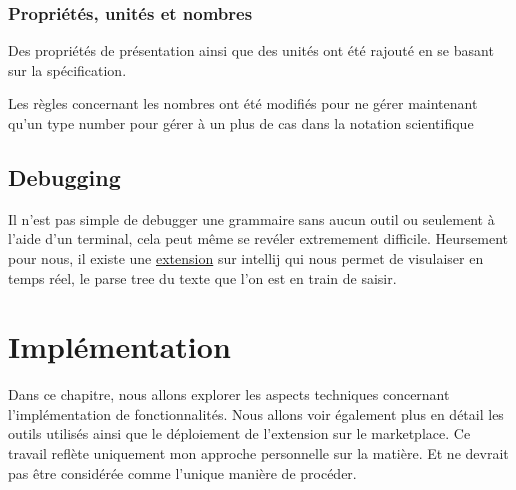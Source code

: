 \documentclass[
    iict, %
    il, %
]{heig-tb}
\begin{document}
\subsection{Propriétés, unités et nombres}

Des propriétés de présentation %
ainsi que des unités ont été rajouté en se basant sur la spécification.

Les règles concernant les nombres ont été modifiés pour ne gérer maintenant qu'un type number
pour gérer à un plus de cas dans la notation scientifique

\section{Debugging}

Il n'est pas simple de debugger une grammaire sans aucun outil ou seulement à l'aide d'un terminal, cela peut même se revéler extremement difficile.
Heursement pour nous, il existe une \href{https://plugins.jetbrains.com/plugin/7358-antlr-v4}{extension} sur intellij qui nous permet de visulaiser en temps réel, le parse tree du texte que l'on est en train de saisir.




\chapter{Implémentation}
Dans ce chapitre, nous allons explorer les aspects techniques concernant l'implémentation de fonctionnalités. Nous allons voir également plus en détail les outils utilisés ainsi que le déploiement de l'extension sur le marketplace.
Ce travail reflète uniquement mon approche personnelle sur la matière. Et ne devrait pas être considérée comme l'unique manière de procéder.


\end{document}
